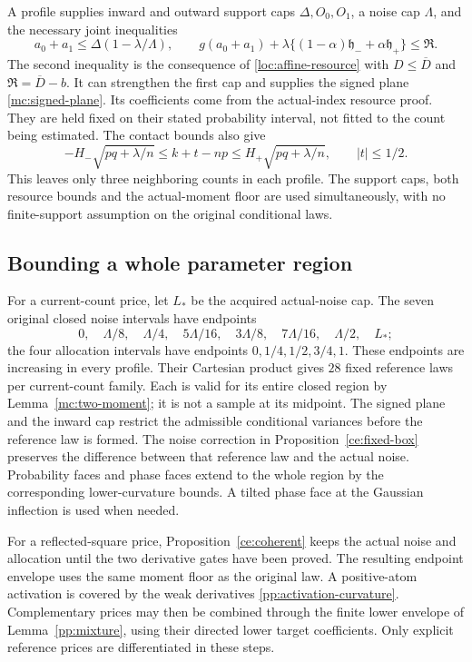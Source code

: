 A profile supplies inward and outward support caps
$\Delta,O_0,O_1$, a noise cap $\Lambda$, and the necessary joint
inequalities
\begin{equation}\label{fc:resources}
 a_0+a_1\le\Delta(1-\lambda/\Lambda),\qquad
g(a_0+a_1)+\lambda
       \{(1-\alpha)\mathfrak h_-+\alpha\mathfrak h_+\}
       \le\mathfrak R.
\end{equation}
The second inequality is the consequence of
\eqref{loc:affine-resource} with $D\le\overline D$ and
$\mathfrak R=\overline D-b$. It can strengthen the first cap and supplies
the signed plane \eqref{mc:signed-plane}. Its coefficients come
from the actual-index resource proof. They are held fixed on
their stated probability interval, not fitted to the count being
estimated. The contact bounds also give
\begin{equation}\label{fc:contact}
 -H_-\sqrt{pq+\lambda/n}
 \le k+t-np\le H_+\sqrt{pq+\lambda/n},\qquad |t|\le1/2.
\end{equation}
This leaves only three neighboring counts in each profile.
The support caps, both resource bounds and the actual-moment floor
are used simultaneously, with no finite-support assumption on the
original conditional laws.

\subsection{Bounding a whole parameter region}
For a current-count price, let $L_*$ be the acquired actual-noise cap.
The seven original closed noise intervals have endpoints
\[
 0,\quad\Lambda/8,\quad\Lambda/4,\quad5\Lambda/16,\quad
 3\Lambda/8,\quad7\Lambda/16,\quad\Lambda/2,\quad L_*;
\]
the four allocation intervals have endpoints $0,1/4,1/2,3/4,1$.
These endpoints are increasing in every profile.
Their Cartesian product gives $28$ fixed reference laws per
current-count family. Each is valid for its entire closed region
by Lemma~\ref{mc:two-moment}; it is not a sample at its midpoint.
The signed plane and the inward cap restrict the admissible
conditional variances before the reference law is formed.
The noise correction in Proposition~\ref{ce:fixed-box} preserves
the difference between that reference law and the actual noise.
Probability faces and phase faces extend to the whole region
by the corresponding lower-curvature bounds. A tilted phase
face at the Gaussian inflection is used when needed.

For a reflected-square price, Proposition~\ref{ce:coherent}
keeps the actual noise and allocation until the two derivative
gates have been proved. The resulting endpoint envelope uses
the same moment floor as the original law. A positive-atom
activation is covered by the weak derivatives
\eqref{pp:activation-curvature}. Complementary prices may then be
combined through the finite lower envelope of Lemma~\ref{pp:mixture},
using their directed lower target coefficients. Only explicit reference prices are
differentiated in these steps.


